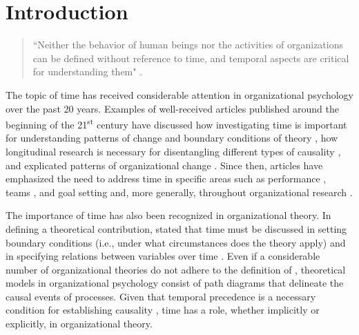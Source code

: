 \documentclass[
12pt, %
twoside,
english]{guelphthesis}
\let\cleardoublepage\clearpage
\newcommand{\setMainMatterLinespacing}{
 \setstretch{2} %

        \setstretch{2}
  }
\let\oldmainmatter\mainmatter
\renewcommand{\mainmatter}{
  \oldmainmatter

  \setMainMatterLinespacing

  
  \pagestyle{mainmatter} %

}
\newcommand{\listappname}{List of Appendices}
\begin{document}
  \cleardoublepage
  \listoffigures
  \newpage


  \cleardoublepage
  \addcontentsline{toc}{chapter}{\listappname}
  \listofapp

  \newpage

\mainmatter %

\nocite{R-tidyverse, R-nonlinSims, R-nonlinSimsAnalysis, R-devtools, R-RColorBrewer, R-cowplot, R-data.table, R-egg, R-ggbrace, R-ggtext, R-kableExtra, R-knitr}

\hypertarget{introduction}{%
\chapter{Introduction}\label{introduction}}
\begin{quote}
    ``Neither the behavior of human beings nor the activities of organizations can be defined without reference to time, and temporal aspects are critical for understanding them" \parencite[][p. 136]{navarro2015}.
\end{quote}
The topic of time has received considerable attention in organizational psychology over the past 20 years. Examples of well-received articles published around the beginning of the 21\textsuperscript{st} century have discussed how investigating time is important for
understanding patterns of change and boundary conditions of theory
\autocite{zaheer1999}, how longitudinal research is necessary for disentangling
different types of causality \autocite{mitchell2001}, and explicated patterns
of organizational change \autocite[or institutionalization;][]{lawrence2001}.
Since then, articles have emphasized the need to address time in
specific areas such as performance \autocite{fisher2008,dalal2014}, teams \autocite{roe2012}, and goal setting \autocite{fried2004} and, more generally, throughout organizational research \autocite{george2000,roe2008,ployhart2010,sonnentag2012,navarro2015,shipp2015,kunisch2017,vantilborgh2018,aguinis2021}.

The importance of time has also been recognized in organizational theory. In defining a theoretical contribution, \textcite{whetten1989} stated that time must be discussed in setting boundary conditions (i.e., under what circumstances does the theory apply) and in specifying relations between variables over time \autocite{mitchell2001,george2000}. Even if a considerable number of organizational theories do not adhere to the definition of \textcite{whetten1989}, theoretical models in organizational psychology consist of path diagrams that delineate the causal events of processes. Given that temporal precedence is a necessary condition for establishing causality \autocite{mill2011}, time has a role, whether implicitly or explicitly, in organizational theory.
\end{document}
